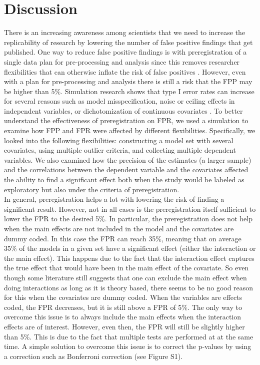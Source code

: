 \section{Discussion}
There is an increasing awareness among scientists that we need to increase the replicability of research by lowering the number of false positive findings that get published. One way to reduce false positive findings is with preregistration of a single data plan for pre-processing and analysis since this removes researcher flexibilities that can otherwise inflate the risk of false positives \citep{Simmons2011}. However, even with a plan for pre-processing and analysis there is still a risk that the FPP may be higher than 5\%. Simulation research shows that type I error rates can increase for several reasons such as model misspecification, noise or ceiling effects in independent variables, or dichotomization of continuous covariates \citep{Dennis2019, Litiere2007, Brunner2009, Austin2003, Austin2004}. To better understand the effectiveness of preregistration on FPR, we used a simulation to examine how FPP and FPR were affected by different flexibilities. Specifically, we looked into the following flexibilities: constructing a model set with several covariates, using multiple outlier criteria, and collecting multiple dependent variables. We also examined how the precision of the estimates (a larger sample) and the correlations between the dependent variable and the covariates affected the ability to find a significant effect both when the study would be labeled as exploratory but also under the criteria of preregistration. \\

In general, preregistration helps a lot with lowering the risk of finding a significant result. However, not in all cases is the preregistration itself sufficient to lower the FPR to the desired 5\%. In particular, the preregistration does not help when the main effects are not included in the model and the covariates are dummy coded. In this case the FPR can reach 35\%, meaning that on average 35\% of the models in a given set have a significant effect (either the interaction or the main effect). This happens due to the fact that the interaction effect captures the true effect that would have been in the main effect of the covariate. So even though some literature still suggests that one can exclude the main effect when doing interactions as long as it is theory based, there seems to be no good reason for this when the covariates are dummy coded. When the variables are effects coded, the FPR decreases, but it is still above a FPR of 5\%. The only way to overcome this issue is to always include the main effects when the interaction effects are of interest. However, even then, the FPR will still be slightly higher than 5\%. This is due to the fact that multiple tests are performed at at the same time. A simple solution to overcome this issue is to correct the p-values by  using a correction such as Bonferroni correction \citep{dunn1961multiple} (see Figure S1).  \\

